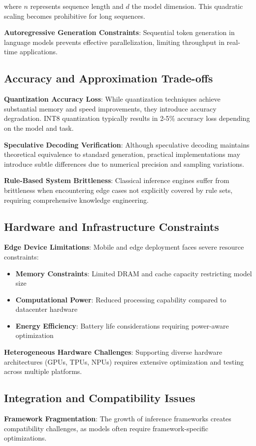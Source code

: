 \documentclass[12pt,a4paper]{article}
\begin{document}
where $n$ represents sequence length and $d$ the model dimension. This quadratic scaling becomes prohibitive for long sequences.

\textbf{Autoregressive Generation Constraints}: Sequential token generation in language models prevents effective parallelization, limiting throughput in real-time applications.

\subsection{Accuracy and Approximation Trade-offs}
\textbf{Quantization Accuracy Loss}: While quantization techniques achieve substantial memory and speed improvements, they introduce accuracy degradation. INT8 quantization typically results in 2-5\% accuracy loss depending on the model and task.

\textbf{Speculative Decoding Verification}: Although speculative decoding maintains theoretical equivalence to standard generation, practical implementations may introduce subtle differences due to numerical precision and sampling variations.

\textbf{Rule-Based System Brittleness}: Classical inference engines suffer from brittleness when encountering edge cases not explicitly covered by rule sets, requiring comprehensive knowledge engineering.

\subsection{Hardware and Infrastructure Constraints}
\textbf{Edge Device Limitations}: Mobile and edge deployment faces severe resource constraints:
\begin{itemize}
    \item \textbf{Memory Constraints}: Limited DRAM and cache capacity restricting model size
    \item \textbf{Computational Power}: Reduced processing capability compared to datacenter hardware
    \item \textbf{Energy Efficiency}: Battery life considerations requiring power-aware optimization
\end{itemize}

\textbf{Heterogeneous Hardware Challenges}: Supporting diverse hardware architectures (GPUs, TPUs, NPUs) requires extensive optimization and testing across multiple platforms.

\subsection{Integration and Compatibility Issues}
\textbf{Framework Fragmentation}: The growth of inference frameworks creates compatibility challenges, as models often require framework-specific optimizations.
\end{document}
